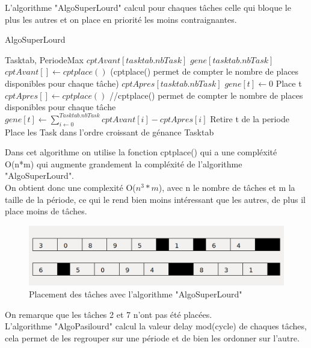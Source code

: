 \documentclass[11pt]{article}
\begin{document}
L'algorithme "AlgoSuperLourd" calcul pour chaques tâches celle qui bloque le plus les autres et on place en priorité les moins contraignantes.\\
\begin{algorithm}
    \caption{AlgoSuperLourd}
    \begin{algorithmic}
    \REQUIRE Tasktab, PeriodeMax
    \STATE $cptAvant[tasktab.nbTask]$
    \STATE $gene[tasktab.nbTask]$
        \STATE $cptAvant[] \leftarrow cptplace()$ (cptplace() permet de compter le nombre de places disponibles pour chaque tâche)
        \STATE $cptApres[tasktab.nbTask]$
            \STATE $gene[t] \leftarrow 0$
                    \STATE Place t
                \ENDIF
            \ENDFOR
            \STATE $cptApres[] \leftarrow cptplace()$ //cptplace() permet de compter le nombre de places disponibles pour chaque tâche
            \STATE $gene[t] \leftarrow \sum\limits_{i\leftarrow0}^{Tasktab.nbTask} cptAvant[i] - cptApres[i]$
            \STATE Retire t de la periode
        \ENDFOR
        \STATE Place les Task dans l'ordre croissant de génance
    \ENDFOR
    \RETURN Tasktab
    \end{algorithmic}
\end{algorithm}
Dans cet algorithme on utilise la fonction cptplace() qui a une compléxité O(n*m) qui augmente grandement la compléxité de l'algorithme "AlgoSuperLourd".\\
On obtient donc une complexité O($n^3*m$), avec n le nombre de tâches et m la taille de la période, ce qui le rend bien moins intéressant que les autres, de plus il place moins de tâches.\\
\begin{figure}
    \center
    \includegraphics[scale = 0.35]{AlgoSuperLourd}
    \caption{Placement des tâches avec l'algorithme "AlgoSuperLourd"}
\end{figure}
On remarque que les tâches 2 et 7 n'ont pas été placées.\\ 
L'algorithme "AlgoPasilourd" calcul la valeur delay mod(cycle) de chaques tâches, cela permet de les regrouper sur une période et de bien les ordonner sur l'autre.\\
\end{document}
